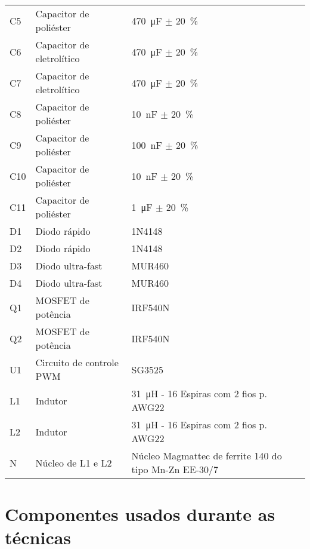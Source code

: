 \begin{table}[htbp]
\begin{tabular}{@{}|m{}|m{}|m{}|@{}}
            C5	&	Capacitor de poliéster	    &	\SI{470}{\micro\farad} $\pm$ \SI{20}{\percent}\\
            C6	&	Capacitor de eletrolítico	&	\SI{470}{\micro\farad} $\pm$ \SI{20}{\percent}\\
            C7	&	Capacitor de eletrolítico	&	\SI{470}{\micro\farad} $\pm$ \SI{20}{\percent}\\
            C8	&	Capacitor de poliéster	    &	\SI{10}{\nano\farad} $\pm$ \SI{20}{\percent}\\
            C9	&	Capacitor de poliéster	    &	\SI{100}{\nano\farad} $\pm$ \SI{20}{\percent}\\
            C10	&	Capacitor de poliéster	    &	\SI{10}{\nano\farad} $\pm$ \SI{20}{\percent}\\
            C11	&	Capacitor de poliéster	    &	\SI{1}{\micro\farad} $\pm$ \SI{20}{\percent}\\
            D1	&	Diodo rápido                &	1N4148\\
            D2	&	Diodo rápido                &	1N4148\\
            D3	&	Diodo ultra-fast            &	MUR460\\
            D4	&	Diodo ultra-fast            &	MUR460\\
            Q1	&	MOSFET de potência          &	IRF540N\\
            Q2	&	MOSFET de potência          &	IRF540N\\
            U1	&	Circuito de controle PWM    &	SG3525\\
            L1	&	Indutor             	    &	\SI{31}{\micro\henry} - 16 Espiras com 2 fios p. AWG22  \\
            L2	&	Indutor             	    &	\SI{31}{\micro\henry} - 16 Espiras com 2 fios p. AWG22  \\
            N   &	Núcleo de L1 e L2           &	Núcleo Magmattec de ferrite 140 do tipo Mn-Zn EE-30/7 \\
            \hline
        \end{tabular}
    \end{table}

\chapter{Componentes usados durante as técnicas}

